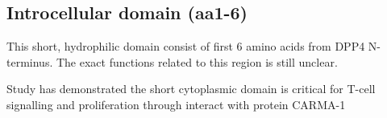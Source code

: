 \subsection{Introcellular domain (aa1-6)}

This short, hydrophilic domain consist of first 6 amino acids from DPP4 N-terminus. The exact functions related to this region is still unclear.

Study has demonstrated the short cytoplasmic domain is critical for T-cell signalling and proliferation through interact with protein CARMA-1 